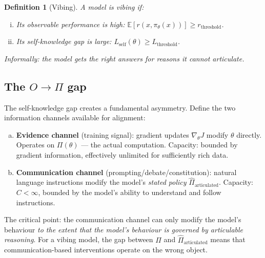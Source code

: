 \documentclass[11pt,a4paper]{article}
\newtheorem{definition}[theorem]{Definition}
\newcommand{\E}{\mathbb{E}}
\begin{document}
\begin{definition}[Vibing]
\label{def:vibing}
A model is \emph{vibing} if:
\begin{enumerate}[(i)]
    \item Its observable performance is high: $\E[r(x, \pi_\theta(x))] \geq r_{\mathrm{threshold}}$.
    \item Its self-knowledge gap is large: $L_{\mathrm{self}}(\theta) \geq L_{\mathrm{threshold}}$.
\end{enumerate}
Informally: the model gets the right answers for reasons it cannot articulate.
\end{definition}

\subsection{The $O \to \Pi$ gap}

The self-knowledge gap creates a fundamental asymmetry. Define the two information channels available for alignment:

\begin{enumerate}[(a)]
    \item \textbf{Evidence channel} (training signal): gradient updates $\nabla_\theta J$ modify $\theta$ directly. Operates on $\Pi(\theta)$ --- the actual computation. Capacity: bounded by gradient information, effectively unlimited for sufficiently rich data.

    \item \textbf{Communication channel} (prompting/debate/constitution): natural language instructions modify the model's \emph{stated policy} $\hat{\Pi}_{\mathrm{articulated}}$. Capacity: $C < \infty$, bounded by the model's ability to understand and follow instructions.
\end{enumerate}

The critical point: the communication channel can only modify the model's behaviour \emph{to the extent that the model's behaviour is governed by articulable reasoning}. For a vibing model, the gap between $\Pi$ and $\hat{\Pi}_{\mathrm{articulated}}$ means that communication-based interventions operate on the wrong object.
\end{document}
